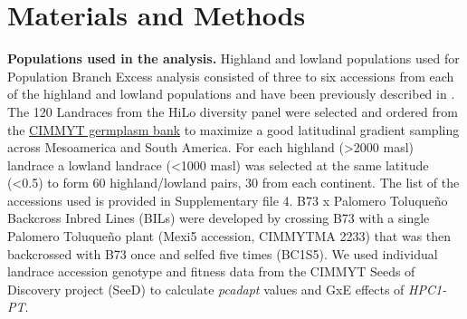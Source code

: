 \documentclass[9pt,twocolumn,twoside,lineno]{BioRxiv}
\begin{document}

\section{Materials and Methods}
\label{sec:materials:methods}
\textbf{Populations used in the analysis.} 
Highland and lowland populations used for Population Branch Excess analysis consisted of three to six accessions from each of the highland and lowland populations and have been previously described in \cite{Wang2020-mp, Wang2017-bc}. 
The 120 Landraces from the HiLo diversity panel were selected and ordered from the \href{http://mgb.cimmyt.org/gringlobal/search.aspx}{CIMMYT germplasm bank} to maximize a good latitudinal gradient sampling across Mesoamerica and South America. For each highland  (>2000 masl) landrace a lowland landrace (<1000 masl) was selected at the same latitude (<0.5\degree) to form 60 highland/lowland pairs, 30 from each continent. 
The list of the accessions used is provided in Supplementary file 4.   
B73 x Palomero Toluqueño Backcross Inbred Lines (BILs) were developed by crossing B73 with a single Palomero Toluqueño plant (Mexi5 accession, CIMMYTMA 2233) that was then backcrossed with B73 once and selfed five times (BC1S5).  
We used  individual landrace accession genotype and fitness data from the CIMMYT Seeds of Discovery project (SeeD) \cite{Gates2019-xu} to calculate \textit{pcadapt} \cite{Luu2017-ws} values and GxE effects of \textit{HPC1-PT}.
\end{document}
